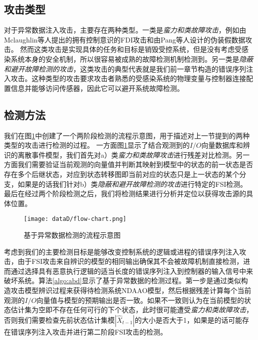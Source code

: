 \subsection {攻击类型}

对于异常数据注入攻击，主要存在两种类型。一类是\textit {蛮力和类故障攻击}，例如由Mclaughlin等人提出的拥有控制意识的FDI攻击\parencite{mclaughlinS2014}和由Pang等人设计的伪装假数据攻击\parencite{pang2015}。 然而这类攻击是实现具体的任务和目标是销毁受控系统，但是没有考虑受感染系统本身的安全机制，所以很容易被成熟的故障检测机制检测到\parencite{roth2012,garcia2012}。另一类是\textit {隐蔽和避开故障检测的攻击}，这类攻击的典型代表就是我们前一章节构造的错误序列注入攻击。这种类型的攻击要求攻击者熟悉的受感染系统的物理变量与控制器连接配置信息并能够访问传感器，因此它可以避开系统故障检测。

\subsection {检测方法}

我们在图\ref {fig28}中创建了一个两阶段检测的流程示意图，用于描述对上一节提到的两种类型的攻击进行检测的过程。 一方面图\ref {fig28}显示了结合观测到的$I/O$向量数据库和辨识的离散事件模型，我们首先对a）类\textit {蛮力和类故障攻击}进行残差对比检测。另一方面我们需要验证当前观测的向量值并判断其映射到模型中的状态的前一状态是否存在多个后继状态，对应到状态转移图即当前对应的状态只是上一状态的某个分支，如果是的话我们针对b）类\textit {隐蔽和避开故障检测的攻击}进行特定的FSI检测。最后在经过两个阶段检测之后，我们将检测结果进行分析并定位以获得攻击源的具体位置。

\begin{figure}[!htb]
		\centering
		\texttt{[image: dataD/flow-chart.png]}
		\caption{基于异常数据检测的流程示意图}
		\label{fig28}
	\end{figure}

考虑到我们的主要检测目标是能够改变控制系统的逻辑或进程的错误序列注入攻击，由于FSI攻击来自辨识的模型的相同输出确保其不会被故障机制直接检测，进而通过选择具有恶意执行逻辑的适当长度的错误序列注入到控制器的输入信号中来破坏系统。算法\ref{algo:abd}显示了基于异常数据的检测过程。第一步是通过类似构造攻击模型辨识过程来获得待检测系统NDAAO模型，然后根据残差计算每个当前观测的$I/O$向量值与模型的预期输出是否一致。如果不一致则认为在当前模型的状态估计集为空即不存在任何可行的下个状态，此时很可能遭受\textit{蛮力和类故障攻击}，否则我们需要检查先前状态估计集模$|\hat{X}_{t-1}|$的大小是否大于1，如果是的话可能存在错误序列注入攻击并进行第二阶段FSI攻击的检测。

